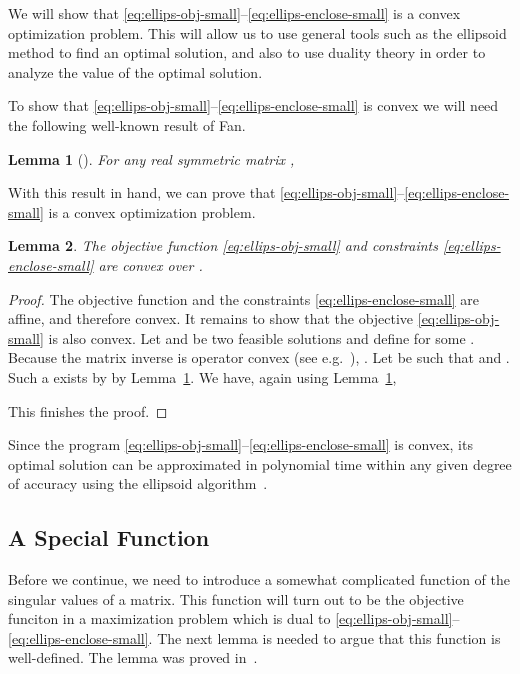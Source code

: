 \documentclass{article}
\newtheorem{lemma}{Lemma}[theorem]
\begin{document}
We will show that
\eqref{eq:ellips-obj-small}--\eqref{eq:ellips-enclose-small} is a
convex optimization problem. This will allow us to use general tools
such as the ellipsoid method to find an optimal solution, and also to
use duality theory in order to analyze the value of the optimal
solution.

To show that
\eqref{eq:ellips-obj-small}--\eqref{eq:ellips-enclose-small} is convex
we will need the following well-known result of Fan.

\begin{lemma}[\cite{Fan49}]\label{lm:kyfan}
  For any  real symmetric matrix , 
  
\end{lemma}

With this result in hand, we can prove that
\eqref{eq:ellips-obj-small}--\eqref{eq:ellips-enclose-small} is a
convex optimization problem.

\begin{lemma}\label{lm:ellips-program-small}
  The objective function \eqref{eq:ellips-obj-small} and constraints
  \eqref{eq:ellips-enclose-small} are convex over .
\end{lemma}
\begin{proof}
  The objective function and the constraints
  \eqref{eq:ellips-enclose-small} are affine, and therefore convex. It
  remains to show that the objective \eqref{eq:ellips-obj-small} is
  also convex. Let  and  be two feasible solutions and
  define  for some . Because the matrix inverse is operator convex (see
  e.g.~\cite{Bhatia-MA}), . Let  be such that  and . Such a  exists by by
  Lemma~\ref{lm:kyfan}. We have, again using Lemma~\ref{lm:kyfan},
  
  This finishes the proof. 
\end{proof}

Since the program
\eqref{eq:ellips-obj-small}--\eqref{eq:ellips-enclose-small} is
convex, its optimal solution can be approximated in polynomial time within
any given degree of accuracy using the ellipsoid
algorithm~\cite{GLS-ellipsoid}.

\subsection{A Special Function}

Before we continue, we need to introduce a somewhat complicated
function of the singular values of a matrix. This function will turn
out to be the objective funciton in a maximization problem which is
dual to \eqref{eq:ellips-obj-small}--\eqref{eq:ellips-enclose-small}.
The next lemma is needed to argue that this function is
well-defined. The lemma was proved in~\cite{simplex}.
\end{document}
